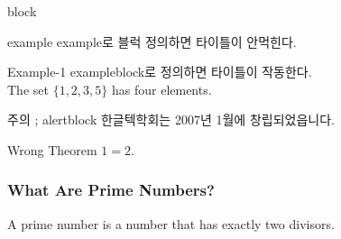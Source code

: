 \documentclass[9pt,blue,xcolor=pdftex,dvipsnames,table,handout,notes]{beamer}
\begin{document}
\begin{frame}[t,squeeze]{block}

			\begin{example} {example}
			example로 블럭 정의하면 타이틀이 안먹힌다.
			\end{example}


			\begin{exampleblock}{Example-1}
			exampleblock로 정의하면 타이틀이 작동한다.\\
			The set $\{1,2,3,5\}$ has four elements.
			\end{exampleblock}




			\begin{alertblock} {주의 ; alertblock}
			한글텍학회는 2007년 1월에 창립되었읍니다.	
			\end{alertblock}

			\begin{alertblock}{Wrong Theorem}
			$1=2$.
			\end{alertblock}

		\end{frame}


\begin{frame}
\frametitle{What Are Prime Numbers?}
\begin{definition}
A \alert{prime number} is a number that has exactly two divisors.
\end{definition}
\end{frame}
\end{document}
